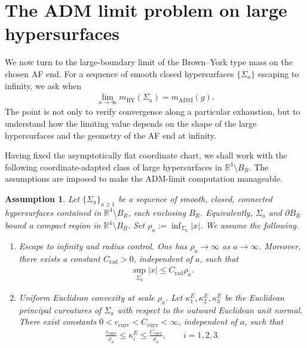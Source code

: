 \documentclass[10pt]{amsart}
\newcommand{\R}{\mathbb{R}}
\newcommand{\ADM}{\mathrm{ADM}}
\newcommand{\BY}{\mathrm{BY}}
\theoremstyle{plain}
\newtheorem{assumption}[theorem]{Assumption}
\theoremstyle{remark}
\begin{document}
	\section{The ADM limit problem on large hypersurfaces}
	\label{sec:BY-large-hypersurfaces}
	
	We now turn to the large-boundary limit of the Brown--York type mass on the
	chosen AF end. For a sequence of smooth closed hypersurfaces $\{\Sigma_a\}$ escaping to infinity, we ask when
	\begin{align}
		\lim_{a\to\infty} m_{\BY}(\Sigma_a)
		=
		m_{\ADM}(g).
	\end{align}
	The point is not only to verify convergence along a particular exhaustion, but
	to understand how the limiting value depends on the shape of the large
	hypersurfaces and the geometry of the AF end at infinity.
	
	Having fixed the asymptotically flat coordinate chart, we shall work with the following coordinate-adapted class of large hypersurfaces in $\R^4\setminus B_R$. The assumptions are imposed to make the ADM-limit computation manageable.
	
	\begin{assumption}\label{ass:large-hypersurfaces}
		Let $\{\Sigma_a\}_{a\geq 1}$ be a sequence of smooth, closed, connected hypersurfaces contained in $\R^4\setminus B_R$, each enclosing $B_R$. Equivalently, $\Sigma_a$ and $\partial B_R$ bound a compact region in $\overline{\R^4\setminus B_R}$. Set
		$\rho_a:=\inf_{\Sigma_a}|x|$. We assume the following.
		
		\begin{enumerate}[label=\textup{(\arabic*)}]
			\item \emph{Escape to infinity and radius control.}
			One has $\rho_a\to\infty$ as $a\to\infty$. Moreover, there exists a
			constant $C_{\mathrm{rad}}>0$, independent of $a$, such that
			\begin{align}
				\sup_{\Sigma_a}|x|
				\leq
				C_{\mathrm{rad}}\rho_a .
			\end{align}
			
			\item \emph{Uniform Euclidean convexity at scale $\rho_a$.}
			Let $\kappa_1^E,\kappa_2^E,\kappa_3^E$ be the Euclidean principal
			curvatures of $\Sigma_a$ with respect to the outward Euclidean
			unit normal. There exist constants
			$0<c_{\mathrm{curv}}<C_{\mathrm{curv}}<\infty$, independent of $a$, such that
			\begin{align}\label{eq:large-hypersurface-curvature-control}
				\frac{c_{\mathrm{curv}}}{\rho_a}
				\leq
				\kappa_i^E
				\leq
				\frac{C_{\mathrm{curv}}}{\rho_a},
				\qquad
				i=1,2,3 .
			\end{align}
		\end{enumerate}
	\end{assumption}
	
\end{document}
